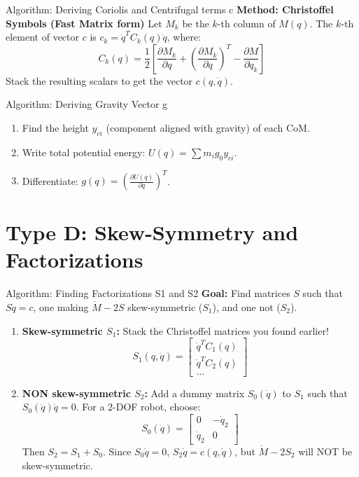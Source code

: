 \documentclass[11pt,a4paper]{article}
\begin{document}
{Algorithm: Deriving Coriolis and Centrifugal terms c}
\textbf{Method: Christoffel Symbols (Fast Matrix form)}
Let $M_k$ be the $k$-th column of $M(q)$. The $k$-th element of vector $c$ is $c_k = \dot{q}^T C_k(q) \dot{q}$, where:
\begin{equation}
    C_k(q) = \frac{1}{2} \left[ \frac{\partial M_k}{\partial q} + \left(\frac{\partial M_k}{\partial q}\right)^T - \frac{\partial M}{\partial q_k} \right]
\end{equation}
Stack the resulting scalars to get the vector $c(q, \dot{q})$.

{Algorithm: Deriving Gravity Vector g}
\begin{enumerate}
    \item Find the height $y_{ci}$ (component aligned with gravity) of each CoM.
    \item Write total potential energy: $U(q) = \sum m_i g_0 y_{ci}$.
    \item Differentiate: $g(q) = \left( \frac{\partial U(q)}{\partial q} \right)^T$.
\end{enumerate}

\section{Type D: Skew-Symmetry and Factorizations}

{Algorithm: Finding Factorizations S1 and S2}
\textbf{Goal:} Find matrices $S$ such that $S \dot{q} = c$, one making $\dot{M} - 2S$ skew-symmetric ($S_1$), and one not ($S_2$).
\begin{enumerate}
    \item \textbf{Skew-symmetric $S_1$:} Stack the Christoffel matrices you found earlier!
    \begin{equation}
        S_1(q,\dot{q}) = \begin{bmatrix} \dot{q}^T C_1(q) \\ \dot{q}^T C_2(q) \\ \dots \end{bmatrix}
    \end{equation}
    
    \item \textbf{NON skew-symmetric $S_2$:} 
    Add a dummy matrix $S_0(\dot{q})$ to $S_1$ such that $S_0(\dot{q})\dot{q} = 0$. For a 2-DOF robot, choose:
    $$ S_0(\dot{q}) = \begin{bmatrix} 0 & -\dot{q}_2 \\ \dot{q}_2 & 0 \end{bmatrix} $$
    Then $S_2 = S_1 + S_0$. Since $S_0 \dot{q} = 0$, $S_2 \dot{q} = c(q, \dot{q})$, but $\dot{M}-2S_2$ will NOT be skew-symmetric.
\end{enumerate}
\end{document}
